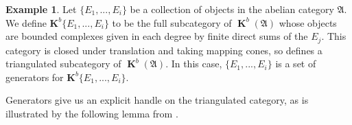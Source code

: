 \documentclass[a4paper]{article}
\theoremstyle{definition}
\newtheorem{example}[defn]{Example}
\theoremstyle{remark}
\DeclareMathOperator{\kom}{{\mathbf{K}}}
\begin{document}
\begin{example}\label{boundedgens}
    Let \(\{E_1,...,E_i\}\) be a collection of objects in the abelian category
    \(\mathfrak{A}\). We define \(\mathbf{K}^b\{E_1,...,E_i\}\) to be the full
    subcategory of \(\kom^b(\mathfrak{A})\) whose objects are bounded complexes
    given in each degree by finite direct sums of the \(E_j\). This category is
    closed under translation and taking mapping cones, so defines a
    triangulated subcategory of \(\kom^b(\mathfrak{A})\). In this case,
    \(\{E_1,...,E_i\}\) is a set of generators for
    \(\mathbf{K}^b\{E_1,...,E_i\}\). 
\end{example}

Generators give us an explicit handle on the triangulated category, as is
illustrated by the following lemma from .
\end{document}
